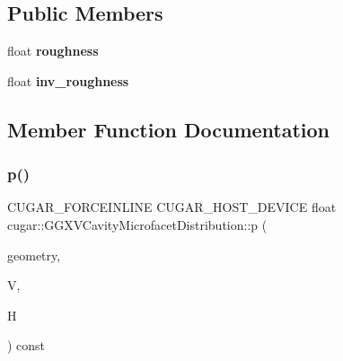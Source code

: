 \subsection*{Public Members}
\begin{DoxyCompactItemize}
\item 
\mbox{\label{structcugar_1_1_g_g_x_v_cavity_microfacet_distribution_a8127b958045cdf4000da62b998a68d50}} 
float {\bfseries roughness}
\item 
\mbox{\label{structcugar_1_1_g_g_x_v_cavity_microfacet_distribution_ae30ccd8917611dbb1cae833fcdc1501d}} 
float {\bfseries inv\+\_\+roughness}
\end{DoxyCompactItemize}


\subsection{Member Function Documentation}
\mbox{\label{structcugar_1_1_g_g_x_v_cavity_microfacet_distribution_ad7ae12c7575dedd7365af16044376fef}} 
\subsubsection{\texorpdfstring{p()}{p()}}
{\footnotesize\ttfamily C\+U\+G\+A\+R\+\_\+\+F\+O\+R\+C\+E\+I\+N\+L\+I\+NE C\+U\+G\+A\+R\+\_\+\+H\+O\+S\+T\+\_\+\+D\+E\+V\+I\+CE float cugar\+::\+G\+G\+X\+V\+Cavity\+Microfacet\+Distribution\+::p (\begin{DoxyParamCaption}\item[{const \hyperlink{structcugar_1_1_differential_geometry}{Differential\+Geometry} \&}]{geometry,  }\item[{const \hyperlink{structcugar_1_1_vector}{Vector3f}}]{V,  }\item[{const \hyperlink{structcugar_1_1_vector}{Vector3f}}]{H }\end{DoxyParamCaption}) const\hspace{0.3cm}{\ttfamily [inline]}}

